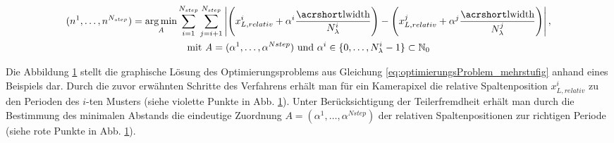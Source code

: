 \begin{equation}\label{eq:optimierungsProblem_mehrstufig}
	\begin{gathered}	
		(n^1,\ldots, n^{N_{step}}) = \argmin_{\mathrm{\textit{A}}}
		\sum\limits_{i = 1}^{N_{step}}
		\sum\limits_{j = i + 1}^{N_{step}}
		\left\lvert
			\Bigg(
				x_{L,relativ}^i + \alpha^i \dfrac{\acrshortmath{lwidth}}{N_\lambda^i}
			\Bigg)
			-
			\Bigg(		
				x_{L,relativ}^j + \alpha^j \dfrac{\acrshortmath{lwidth}}{N_\lambda^j}
			\Bigg)
		\right\rvert,\\
		\text{mit} ~\mathrm{\textit{A}} = (\alpha^1,\ldots,\alpha^{N{step}}) ~\text{und} ~\alpha^i \in \lbrace 0,\ldots, N_\lambda^i - 1 \rbrace \subset \mathbb{N}_0
	\end{gathered}
\end{equation}

{
	\begin{figure}[H]
		\centering
		
		\label{tikz:abbBestimmungEindeutigerPosition}
	\end{figure}
}

\noindent
Die Abbildung \ref{tikz:abbBestimmungEindeutigerPosition} stellt die graphische Lösung des Optimierungsproblems aus Gleichung \ref{eq:optimierungsProblem_mehrstufig} anhand eines Beispiels dar.
Durch die zuvor erwähnten Schritte des Verfahrens erhält man für ein Kamerapixel die relative Spaltenposition $x_{L,relativ}^i$ zu den Perioden des $i$-ten Musters (siehe violette Punkte in Abb. \ref{tikz:abbBestimmungEindeutigerPosition}).
Unter Berücksichtigung der Teilerfremdheit erhält man durch die Bestimmung des minimalen Abstands die eindeutige Zuordnung $\mathrm{\textit{A}} = (\alpha^1,\ldots,\alpha^{N{step}})$ der relativen Spaltenpositionen zur richtigen Periode (siehe rote Punkte in Abb. \ref{tikz:abbBestimmungEindeutigerPosition}).

